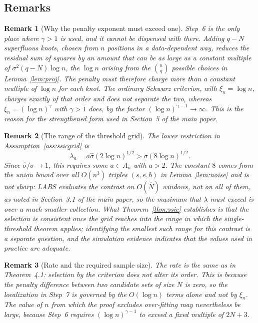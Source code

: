\documentclass[12pt, a4paper]{article}
\newtheorem{remark}{Remark}[section]
\newcommand{\mainthm}{Theorem~4.1}
\begin{document}
\subsection{Remarks}
\label{sup:ssicrem}

\begin{remark}[Why the penalty exponent must exceed one]
\label{rem:gamma}
Step~6 is the only place where $\gamma > 1$ is used, and it cannot be dispensed with there. Adding $q - N$ superfluous knots, chosen from $n$ positions in a
data-dependent way, reduces the residual sum of squares by an amount that can
be as large as a constant multiple of $\sigma^2 (q-N)\log n$, the $\log n$
arising from the $\binom{n}{q}$ possible choices in Lemma~\ref{lem:proj}. The
penalty must therefore charge more than a constant multiple of $\log n$ for
each knot. The ordinary Schwarz criterion, with $\xi_n = \log n$, charges
exactly of that order and does not separate the two, whereas
$\xi_n = (\log n)^\gamma$ with $\gamma > 1$ does, by the factor
$(\log n)^{\gamma-1} \to \infty$. This is the reason for the strengthened form
used in Section~5 of the main paper.
\end{remark}

\begin{remark}[The range of the threshold grid]
\label{rem:gridrange}
The lower restriction in Assumption~\ref{ass:ssicgrid} is
\[
\lambda_a = a\hat\sigma(2\log n)^{1/2}
> \sigma(8\log n)^{1/2}.
\]
Since $\hat\sigma/\sigma \to 1$, this requires some $a \in A_n$ with $a > 2$.
The constant $8$ comes from the
union bound over all $O(n^3)$ triples $(s,e,b)$ in Lemma~\ref{lem:noise} and is
not sharp: LABS evaluates the contrast on $O(\hat N)$ windows, not on all of
them, as noted in Section~3.1 of the main paper, so the maximum that
$\lambda$ must exceed is over a much smaller collection. What
Theorem~\ref{thm:ssic} establishes is that the selection is consistent once the
grid reaches into the range in which the single-threshold theorem applies;
identifying the smallest such range for this contrast is a separate question,
and the simulation evidence indicates that the values used in practice are
adequate.
\end{remark}

\begin{remark}[Rate and the required sample size]
\label{rem:ssicrate}
The rate is the same as in \mainthm{}: selection by the criterion does not
alter its order. This is because the penalty difference between two
candidate sets of size $N$ is zero, so the localization in Step~7 is governed
by the $O(\log n)$ terms alone and not by $\xi_n$. The value of $n$ from which
the proof excludes over-fitting may nevertheless be large, because Step~6
requires $(\log n)^{\gamma-1}$ to exceed a fixed multiple of $2N+3$.
\end{remark}
\end{document}

